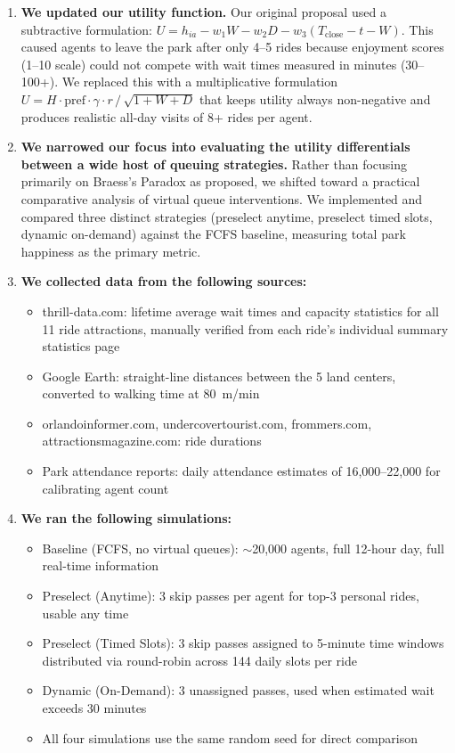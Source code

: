 \documentclass[11pt]{article}
\begin{document}
\begin{enumerate}
    \item \textbf{We updated our utility function.} Our original proposal used a subtractive formulation: $U = h_{ia} - w_1 W - w_2 D - w_3(T_{\text{close}} - t - W)$. This caused agents to leave the park after only 4--5 rides because enjoyment scores (1--10 scale) could not compete with wait times measured in minutes (30--100+). We replaced this with a multiplicative formulation $U = H \cdot \text{pref} \cdot \gamma \cdot r\, /\, \sqrt{1 + W + D}$ that keeps utility always non-negative and produces realistic all-day visits of 8+ rides per agent.

    \item \textbf{We narrowed our focus into evaluating the utility differentials between a wide host of queuing strategies.} Rather than focusing primarily on Braess's Paradox as proposed, we shifted toward a practical comparative analysis of virtual queue interventions. We implemented and compared three distinct strategies (preselect anytime, preselect timed slots, dynamic on-demand) against the FCFS baseline, measuring total park happiness as the primary metric.

    \item \textbf{We collected data from the following sources:}
    \begin{itemize}[nosep]
        \item thrill-data.com: lifetime average wait times and capacity statistics for all 11 ride attractions, manually verified from each ride's individual summary statistics page
        \item Google Earth: straight-line distances between the 5 land centers, converted to walking time at 80~m/min
        \item orlandoinformer.com, undercovertourist.com, frommers.com, attractionsmagazine.com: ride durations
        \item Park attendance reports: daily attendance estimates of 16,000--22,000 for calibrating agent count
    \end{itemize}

    \item \textbf{We ran the following simulations:}
    \begin{itemize}[nosep]
        \item Baseline (FCFS, no virtual queues): $\sim$20,000 agents, full 12-hour day, full real-time information
        \item Preselect (Anytime): 3 skip passes per agent for top-3 personal rides, usable any time
        \item Preselect (Timed Slots): 3 skip passes assigned to 5-minute time windows distributed via round-robin across 144 daily slots per ride
        \item Dynamic (On-Demand): 3 unassigned passes, used when estimated wait exceeds 30 minutes
        \item All four simulations use the same random seed for direct comparison
    \end{itemize}


\end{enumerate}
\end{document}
